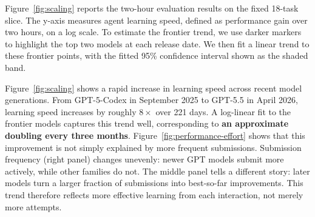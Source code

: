 Figure~\ref{fig:scaling} reports the two-hour evaluation results on the fixed 18-task slice. The y-axis measures agent learning speed, defined as performance gain over two hours, on a log scale. To estimate the frontier trend, we use darker markers to highlight the top two models at each release date. We then fit a linear trend to these frontier points, with the fitted 95\% confidence interval shown as the shaded band.

Figure~\ref{fig:scaling} shows a rapid increase in learning speed across recent model generations. From GPT-5-Codex in September 2025 to GPT-5.5 in April 2026, learning speed increases by roughly $8\times$ over 221 days. A log-linear fit to the frontier models captures this trend well, corresponding to \textbf{an approximate doubling every three months}. Figure~\ref{fig:performance-effort} shows that this improvement is not simply explained by more frequent submissions. Submission frequency (right panel) changes unevenly: newer GPT models submit more actively, while other families do not. The middle panel tells a different story: later models turn a larger fraction of submissions into best-so-far improvements. This trend therefore reflects more effective learning from each interaction, not merely more attempts.
